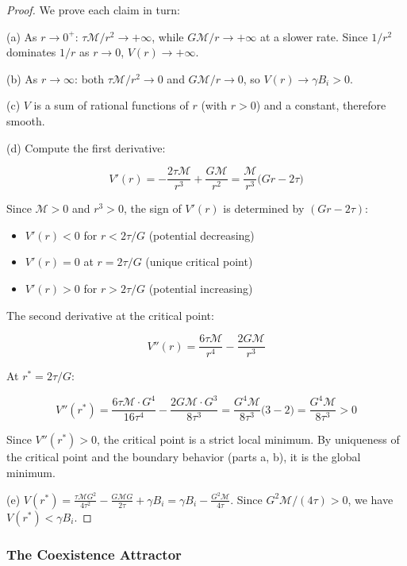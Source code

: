 \documentclass[11pt]{article}
\theoremstyle{plain}
\theoremstyle{definition}
\theoremstyle{remark}
\let\origsubsubsection\subsubsection
\renewcommand{\subsubsection}{\needspace{4\baselineskip}\origsubsubsection}
\begin{document}
\begin{proof}
We prove each claim in turn:

(a) As $r \to 0^+$: $\tau \mathcal{M}/r^2 \to +\infty$, while $G\mathcal{M}/r \to +\infty$ at a slower rate. Since $1/r^2$ dominates $1/r$ as $r \to 0$, $V(r) \to +\infty$.

(b) As $r \to \infty$: both $\tau\mathcal{M}/r^2 \to 0$ and $G\mathcal{M}/r \to 0$, so $V(r) \to \gamma B_i > 0$.

(c) $V$ is a sum of rational functions of $r$ (with $r > 0$) and a constant, therefore smooth.

(d) Compute the first derivative:

$$V'(r) = -\frac{2\tau\mathcal{M}}{r^3} + \frac{G\mathcal{M}}{r^2} = \frac{\mathcal{M}}{r^3}\bigl(Gr - 2\tau\bigr)$$

Since $\mathcal{M} > 0$ and $r^3 > 0$, the sign of $V'(r)$ is determined by $(Gr - 2\tau)$:

\begin{itemize}
\item $V'(r) < 0$ for $r < 2\tau/G$ (potential decreasing)
\item $V'(r) = 0$ at $r = 2\tau/G$ (unique critical point)
\item $V'(r) > 0$ for $r > 2\tau/G$ (potential increasing)
\end{itemize}
The second derivative at the critical point:

$$V''(r) = \frac{6\tau\mathcal{M}}{r^4} - \frac{2G\mathcal{M}}{r^3}$$

At $r^* = 2\tau/G$:

$$V''(r^*) = \frac{6\tau\mathcal{M} \cdot G^4}{16\tau^4} - \frac{2G\mathcal{M} \cdot G^3}{8\tau^3} = \frac{G^4\mathcal{M}}{8\tau^3}\bigl(3 - 2\bigr) = \frac{G^4\mathcal{M}}{8\tau^3} > 0$$

Since $V''(r^*) > 0$, the critical point is a strict local minimum. By uniqueness of the critical point and the boundary behavior (parts a, b), it is the global minimum.

(e) $V(r^*) = \frac{\tau\mathcal{M}G^2}{4\tau^2} - \frac{G\mathcal{M}G}{2\tau} + \gamma B_i = \gamma B_i - \frac{G^2\mathcal{M}}{4\tau}$. Since $G^2\mathcal{M}/(4\tau) > 0$, we have $V(r^*) < \gamma B_i$.
\end{proof}

\subsubsection{The Coexistence
Attractor}\label{the-coexistence-attractor}
\end{document}
